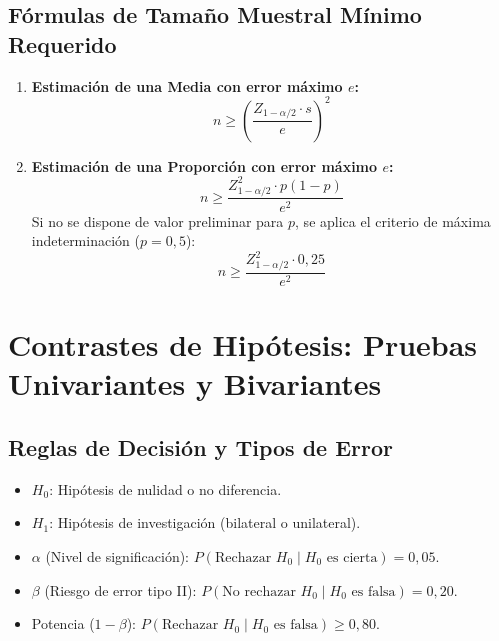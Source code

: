 \documentclass[11pt,a4paper]{report}
\theoremstyle{definition}
\begin{document}
\section{Fórmulas de Tamaño Muestral Mínimo Requerido}
\begin{enumerate}[leftmargin=*]
    \item \textbf{Estimación de una Media con error máximo $e$:}
    \begin{equation}
    n \ge \left( \frac{Z_{1-\alpha/2} \cdot s}{e} \right)^2
    \end{equation}
    \item \textbf{Estimación de una Proporción con error máximo $e$:}
    \begin{equation}
    n \ge \frac{Z_{1-\alpha/2}^2 \cdot p(1-p)}{e^2}
    \end{equation}
    Si no se dispone de valor preliminar para $p$, se aplica el criterio de máxima indeterminación ($p = 0{,}5$):
    \begin{equation}
    n \ge \frac{Z_{1-\alpha/2}^2 \cdot 0{,}25}{e^2}
    \end{equation}
\end{enumerate}

\newpage
\chapter{Contrastes de Hipótesis: Pruebas Univariantes y Bivariantes}

\section{Reglas de Decisión y Tipos de Error}
\begin{itemize}[leftmargin=*]
    \item $H_0$: Hipótesis de nulidad o no diferencia.
    \item $H_1$: Hipótesis de investigación (bilateral o unilateral).
    \item $\alpha$ (Nivel de significación): $P(\text{Rechazar } H_0 \mid H_0 \text{ es cierta}) = 0{,}05$.
    \item $\beta$ (Riesgo de error tipo II): $P(\text{No rechazar } H_0 \mid H_0 \text{ es falsa}) = 0{,}20$.
    \item Potencia ($1-\beta$): $P(\text{Rechazar } H_0 \mid H_0 \text{ es falsa}) \ge 0{,}80$.
\end{itemize}
\end{document}
